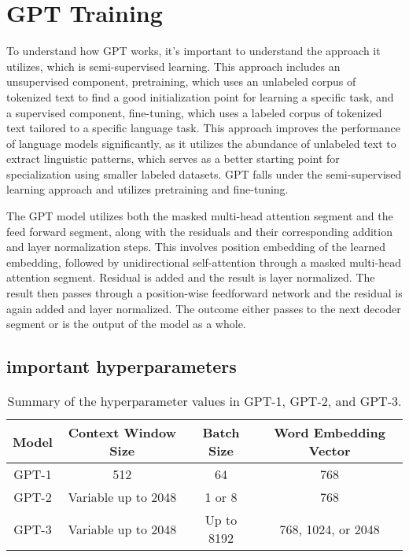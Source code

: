 \documentclass[
	11pt,
	a4paper,
	figtabcapt,
]{oblivoir}
\begin{document}
\section{GPT Training}\label{sec:training}
To understand how GPT works, it's important to understand the approach it utilizes, which is semi-supervised learning.
This approach includes an unsupervised component, pretraining, which uses an unlabeled corpus of tokenized text to find a good initialization point for learning a specific task, and a supervised component, fine-tuning, which uses a labeled corpus of tokenized text tailored to a specific language task.
This approach improves the performance of language models significantly, as it utilizes the abundance of unlabeled text to extract linguistic patterns, which serves as a better starting point for specialization using smaller labeled datasets.
GPT falls under the semi-supervised learning approach and utilizes pretraining and fine-tuning.

The GPT model utilizes both the masked multi-head attention segment and the feed forward segment, along with the residuals and their corresponding addition and layer normalization steps.
This involves position embedding of the learned embedding, followed by unidirectional self-attention through a masked multi-head attention segment. Residual is added and the result is layer normalized. The result then passes through a position-wise feedforward network and the residual is again added and layer normalized.
The outcome either passes to the next decoder segment or is the output of the model as a whole.

\subsection{important hyperparameters}
\begin{table}[h]
	\centering
	\begin{tabular}{|c|c|c|c|}
	\hline
	Model & Context Window Size & Batch Size & Word Embedding Vector \\
	\hline
	GPT-1 & 512 & 64 & 768 \\
	\hline
	GPT-2 & Variable up to 2048 & 1 or 8 & 768 \\
	\hline
	GPT-3 & Variable up to 2048 & Up to 8192 & 768, 1024, or 2048 \\
	\hline
	\end{tabular}
	\caption{Summary of the hyperparameter values in GPT-1, GPT-2, and GPT-3.}
	\end{table}
	
\end{document}
